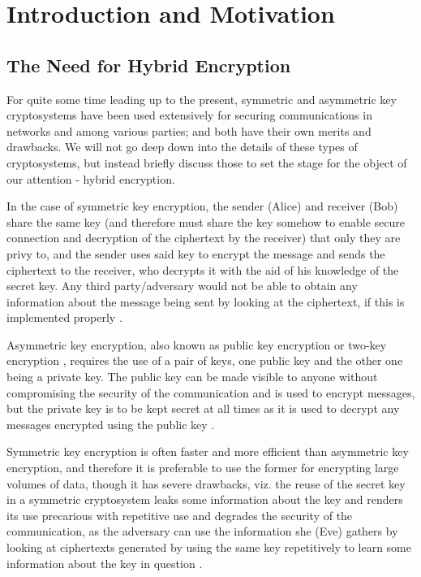 \newcommand{\symm}{\text{symm}}

\section{Introduction and Motivation}

\label{sec:intro}

\subsection{The Need for Hybrid Encryption}

For quite some time leading up to the present, symmetric and asymmetric key cryptosystems have been used extensively for securing communications in networks and among various parties; and both have their own merits and drawbacks.
We will not go deep down into the details of these types of cryptosystems, but instead briefly discuss those to set the stage for the object of our attention - hybrid encryption.

In the case of symmetric key encryption, the sender (Alice) and receiver (Bob) share the same key (and therefore must share the key somehow to enable secure connection and decryption of the ciphertext by the receiver) that only they are privy to, and the sender uses said key to encrypt the message and sends the ciphertext to the receiver, who decrypts it with the aid of his knowledge of the secret key.
Any third party/adversary would not be able to obtain any information about the message being sent by looking at the ciphertext, if this is implemented properly \cite{smirnoff_turner_2019}.

Asymmetric key encryption, also known as public key encryption or two-key encryption \cite{kaliski_acry}, requires the use of a pair of keys, one public key and the other one being a private key.
The public key can be made visible to anyone without compromising the security of the communication and is used to encrypt messages, but the private key is to be kept secret at all times as it is used to decrypt any messages encrypted using the public key \cite{savvyasym}.

Symmetric key encryption is often faster and more efficient than asymmetric key encryption, and therefore it is preferable to use the former for encrypting large volumes of data, though it has severe drawbacks, viz. the reuse of the secret key in a symmetric cryptosystem leaks some information about the key and renders its use precarious with repetitive use and degrades the security of the communication, as the adversary can use the information she (Eve) gathers by looking at ciphertexts generated by using the same key repetitively to learn some information about the key in question \cite{smirnoff_turner_2019}.

